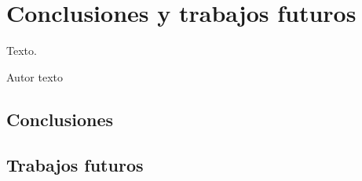 \chapter{Conclusiones y trabajos futuros}
\label{cha:Conclusiones y trabajos futuros}

\begin{FraseCelebre}
  \begin{Frase}
    Texto.
  \end{Frase}
  \begin{Fuente}
    Autor texto
  \end{Fuente}
\end{FraseCelebre}

\section{Conclusiones}
\label{sec:Conclusiones}

\section{Trabajos futuros}
\label{sec:Trabajos futuros}
